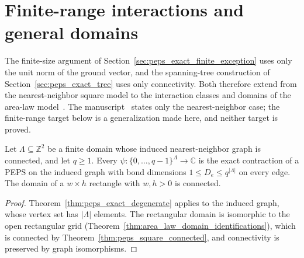 \section{Finite-range interactions and general domains}
\label{sec:peps_exact_finite_range}


The finite-size argument of Section~\ref{sec:peps_exact_finite_exception}
uses only the unit norm of the ground vector, and the spanning-tree
construction of Section~\ref{sec:peps_exact_tree} uses only connectivity.
Both therefore extend from the nearest-neighbor square model to the
interaction classes and domains of the area-law
model~\cite[Section~1]{OpenAI2026AreaLaw}. The
manuscript~\cite{OpenAI2026PolynomialPEPS} states only the nearest-neighbor
case; the finite-range target below is a generalization made here, and
neither target is proved.

\begin{theorem}
    \label{thm:peps_exact_domain}
    \leanok
    Let $\Lambda\subseteq\mathbb Z^2$ be a finite domain whose induced
    nearest-neighbor graph is connected, and let $q\ge1$. Every
    $\psi\colon\{0,\ldots,q-1\}^{\Lambda}\to\mathbb C$ is the exact
    contraction of a PEPS on the induced graph with bond dimensions
    $1\le D_e\le q^{|\Lambda|}$ on every edge. The domain of a $w\times h$
    rectangle with $w,h>0$ is connected.
\end{theorem}
\begin{proof}
    \leanok
    Theorem~\ref{thm:peps_exact_degenerate} applies to the induced graph,
    whose vertex set has $|\Lambda|$ elements. The rectangular domain is
    isomorphic to the open rectangular grid
    (Theorem~\ref{thm:area_law_domain_identifications}), which is connected
    by Theorem~\ref{thm:peps_square_connected}, and connectivity is
    preserved by graph isomorphisms.
\end{proof}

